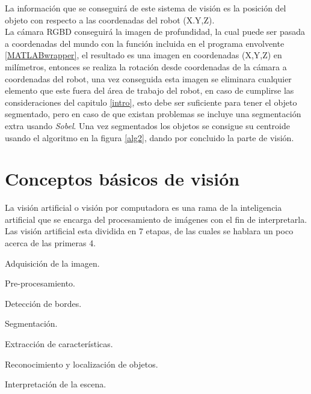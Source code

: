     La información que se conseguirá de este sistema de visión es la posición del objeto con respecto a las coordenadas del robot (X.Y,Z).\\
    La cámara RGBD conseguirá la imagen de profundidad, la cual puede ser pasada a coordenadas del mundo con la función incluida en el programa envolvente \cref{MATLABwrapper}, el resultado es una imagen en coordenadas (X,Y,Z) en milímetros, entonces se realiza la rotación desde coordenadas de la cámara a coordenadas del robot, una vez conseguida esta imagen se eliminara cualquier elemento que este fuera del área de trabajo del robot, en caso de cumplirse las consideraciones del  capitulo \ref{intro}, esto debe ser suficiente para tener el objeto segmentado, pero en caso de que existan problemas se incluye una segmentación extra usando \textit{Sobel}.
    Una vez segmentados los objetos se consigue su centroide usando el algoritmo en la figura \ref{alg2}, dando por concluido la parte de visión.
    
    
    \section{Conceptos básicos de visión}
    
    La visión artificial o visión por computadora es una rama de la inteligencia artificial que se encarga del procesamiento de imágenes con el fin de interpretarla.
    Las visión artificial esta dividida en 7 etapas, de las cuales se hablara un poco acerca de las primeras 4.
    
    \begin{prop}
    	\item  Adquisición de la imagen. \label{viseta:1}
    	\item  Pre-procesamiento. \label{viseta:2}
    	\item  Detección de bordes. \label{viseta:3}
    	\item  Segmentación. \label{viseta:4}
    	\item  Extracción de características. \label{viseta:5}
    	\item  Reconocimiento y localización de objetos. \label{viseta:6}
    	\item  Interpretación de la escena. \label{viseta:7}
    \end{prop} 
    
